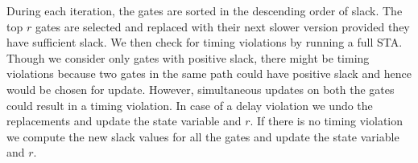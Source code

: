 During each iteration, the gates are sorted in the descending order of slack. The top $r$ gates are selected and replaced with their next slower version provided they have sufficient slack. We then check for timing violations by running a full STA. Though we consider only gates with positive slack, there might be timing violations because two gates in the same path could have positive slack and hence would be chosen for update. However, simultaneous updates on both the gates could result in a timing violation. In case of a delay violation we undo the replacements and update the state variable and $r$. If there is no timing violation we compute the new slack values for all the gates and update the state variable and $r$.


 
 


 


